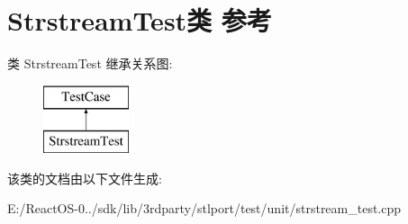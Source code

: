 \hypertarget{class_strstream_test}{}\section{Strstream\+Test类 参考}
\label{class_strstream_test}
类 Strstream\+Test 继承关系图\+:\begin{figure}[H]
\begin{center}
\leavevmode
\includegraphics[height=2.000000cm]{class_strstream_test}
\end{center}
\end{figure}


该类的文档由以下文件生成\+:\begin{DoxyCompactItemize}
\item 
E\+:/\+React\+O\+S-\/0../sdk/lib/3rdparty/stlport/test/unit/strstream\+\_\+test.\+cpp\end{DoxyCompactItemize}

